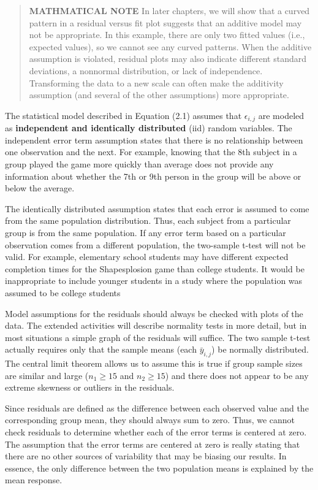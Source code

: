 \documentclass[
]{report}
\begin{document}
\begin{quote}
\textbf{MATHMATICAL NOTE}
In later chapters, we will show that a curved pattern in a residual versus fit plot suggests that an additive model may not be appropriate. In this example, there are only two fitted values (i.e., expected values), so we cannot see any curved patterns. When the additive assumption is violated, residual plots may also indicate different standard deviations, a nonnormal distribution, or lack of independence. Transforming the data to a new scale can often make the additivity assumption (and several of the other assumptions) more appropriate.
\end{quote}

The statistical model described in Equation (2.1) assumes that \(\epsilon_{i, j}\) are modeled as \textbf{independent and identically distributed} (iid) random variables. The independent error term assumption states that there is no relationship between one observation and the next. For example, knowing that the 8th subject in a group played the game more quickly than average does not provide any information about whether the 7th or 9th person in the group will be above or below the average.

The identically distributed assumption states that each error is assumed to come from the same population distribution. Thus, each subject from a particular group is from the same population. If any error term
based on a particular observation comes from a different population, the two-sample t-test will not be valid. For example, elementary school students may have different expected completion times for the Shapesplosion game than college students. It would be inappropriate to include younger students in a study where the population was assumed to be college students

Model assumptions for the residuals should always be checked with plots of the data. The extended activities will describe normality tests in more detail, but in most situations a simple graph of the residuals will
suffice. The two sample t-test actually requires only that the sample means (each \(\bar{y}_{i,j}\)) be normally distributed. The central limit theorem allows us to assume this is true if group sample sizes are similar and large (\(n_1 \ge 15\) and \(n_2 \ge 15\)) and there does not appear to be any extreme skewness or outliers in the residuals.

Since residuals are defined as the difference between each observed value and the corresponding group mean, they should always sum to zero. Thus, we cannot check residuals to determine whether each of the error
terms is centered at zero. The assumption that the error terms are centered at zero is really stating that there are no other sources of variability that may be biasing our results. In essence, the only difference between the two population means is explained by the mean response.
\end{document}
